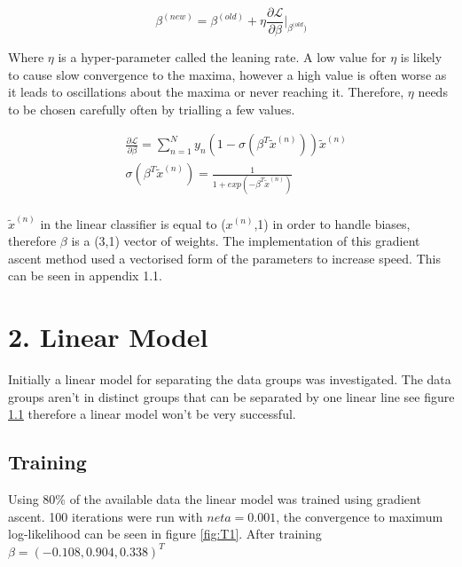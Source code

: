 \documentclass[twoside,twocolumn]{article}
\begin{document}
\begin{equation}
\label{update}
\beta^{(new)}=\beta^{(old)}+\eta \frac{\partial \mathcal{L}}{\partial \beta}\bigg\rvert_{\beta^{(old})}
\end{equation}

Where $\eta$ is a hyper-parameter called the leaning rate. A low value for $\eta$ is likely to cause slow convergence to the maxima, however a high value is often worse as it leads to oscillations about the maxima or never reaching it. Therefore, $\eta$ needs to be chosen carefully often by trialling a few values.

\begin{equation}
\label{grad}
\begin{split}
&\frac{\partial \mathcal{L}}{\partial \beta} = \sum^N_{n=1}y_n(1-\sigma(\beta^T\tilde{x}^{(n)}))\tilde{x}^{(n)} \\
&\sigma(\beta^T\tilde{x}^{(n)}) = \frac{1}{1+exp(-\beta^T\tilde{x}^{(n)})}\\
\end{split}
\end{equation}

$\tilde{x}^{(n)}$ in the linear classifier is equal to ($x^{(n)}$,1) in order to handle biases, therefore $\beta$ is a (3,1) vector of weights.
The implementation of this gradient ascent method used a vectorised form of the parameters to increase speed. This can be seen in appendix 1.1.
\section{2. Linear Model}
Initially a linear model for separating the data groups was investigated. The data groups aren't in distinct groups that can be separated by one linear line see figure \ref{} therefore a linear model won't be very successful. 
\subsection{Training}
Using 80\% of the available data the linear model was trained using gradient ascent. 100 iterations were run with $neta =0.001$, the convergence to maximum log-likelihood can be seen in figure \ref{fig:T1}. After training $\beta= (-0.108,0.904,0.338)^T$
\end{document}
